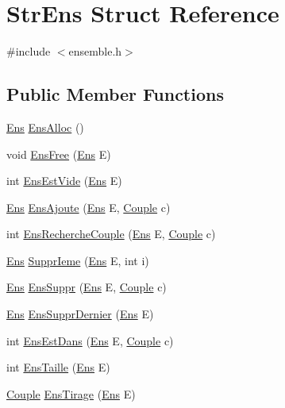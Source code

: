 \hypertarget{structStrEns}{
\section{StrEns Struct Reference}
\label{structStrEns}
}


{\ttfamily \#include $<$ensemble.h$>$}

\subsection*{Public Member Functions}
\begin{DoxyCompactItemize}
\item 
\hyperlink{structStrEns}{Ens} \hyperlink{structStrEns_a5431a78349672ade3c4f8d2e28b501bc}{EnsAlloc} ()
\item 
void \hyperlink{structStrEns_a2d30545135833c2bbdfe6c1e8b827c53}{EnsFree} (\hyperlink{structStrEns}{Ens} E)
\item 
int \hyperlink{structStrEns_a66bbbdad09f8ec02eb5271b8d87662d7}{EnsEstVide} (\hyperlink{structStrEns}{Ens} E)
\item 
\hyperlink{structStrEns}{Ens} \hyperlink{structStrEns_aecfa513ab23473ffa3089648439211b3}{EnsAjoute} (\hyperlink{structStrEns}{Ens} E, \hyperlink{structCouple}{Couple} c)
\item 
int \hyperlink{structStrEns_a5c371fe35905063264e488ef6ce83b50}{EnsRechercheCouple} (\hyperlink{structStrEns}{Ens} E, \hyperlink{structCouple}{Couple} c)
\item 
\hyperlink{structStrEns}{Ens} \hyperlink{structStrEns_ac906334f94a3034d3331176038e7be0d}{SupprIeme} (\hyperlink{structStrEns}{Ens} E, int i)
\item 
\hyperlink{structStrEns}{Ens} \hyperlink{structStrEns_a71f5e80ca6905dc7eae20914fd99e211}{EnsSuppr} (\hyperlink{structStrEns}{Ens} E, \hyperlink{structCouple}{Couple} c)
\item 
\hyperlink{structStrEns}{Ens} \hyperlink{structStrEns_a8d69db4d94d904a786b6b55e699548f3}{EnsSupprDernier} (\hyperlink{structStrEns}{Ens} E)
\item 
int \hyperlink{structStrEns_ae13b51eb0860fc024785b3f2cc6a2e6c}{EnsEstDans} (\hyperlink{structStrEns}{Ens} E, \hyperlink{structCouple}{Couple} c)
\item 
int \hyperlink{structStrEns_a24000b3f5c1551ba84495d216163804d}{EnsTaille} (\hyperlink{structStrEns}{Ens} E)
\item 
\hyperlink{structCouple}{Couple} \hyperlink{structStrEns_a4e8e89b7b3814c232c2e1df27b8faf4d}{EnsTirage} (\hyperlink{structStrEns}{Ens} E)
\end{DoxyCompactItemize}
